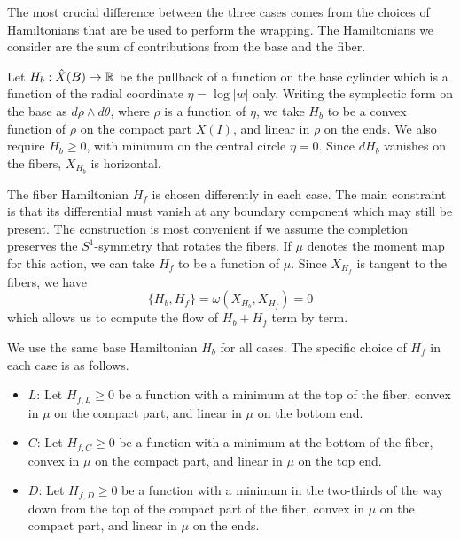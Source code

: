 \documentclass[12pt]{amsart}
\begin{document}
The most crucial difference between the three cases comes from the
choices of Hamiltonians that are be used to perform the wrapping. The
Hamiltonians we consider are the sum of contributions from the base
and the fiber. 

Let $H_b: \hat{X}(B) \to \mathbb{R}$ be the pullback of a function on the base
cylinder which is a function of the radial coordinate $\eta = \log|w|$
only. Writing the symplectic form on the base as $d\rho \wedge
d\theta$, where $\rho$ is a function of $\eta$, we take $H_b$ to be a
convex function of $\rho$ on the compact part $X(I)$, and linear in
$\rho$ on the ends. We also require $H_b \geq 0$, with minimum on the
central circle $\eta = 0$. Since $dH_b$ vanishes on the fibers, $X_{H_b}$ is
horizontal.

The fiber Hamiltonian $H_f$ is chosen differently in each case. The main
constraint is that its differential must vanish at any boundary
component which may still be present. The construction is most
convenient if we assume the completion preserves the $S^1$-symmetry
that rotates the fibers. If $\mu$ denotes the moment map for this
action, we can take $H_f$ to be a function of
$\mu$. Since $X_{H_f}$ is tangent to the fibers, we have
\begin{equation}
  \{H_b,H_f\} = \omega(X_{H_b},X_{H_f}) = 0
\end{equation}
which allows us to compute the flow of $H_b+H_f$ term by term.

We use the same base Hamiltonian $H_b$ for all cases. The specific
choice of $H_f$ in each case is as follows.
\begin{itemize}
\item $L$: Let $H_{f,L} \geq 0$ be a function with a minimum at the
  top of the fiber, convex in $\mu$ on the compact part, and linear
  in $\mu$ on the bottom end. 
\item $C$: Let $H_{f,C} \geq 0$ be a function with a minimum at the
  bottom of the fiber, convex in $\mu$ on the compact part, and linear
  in $\mu$ on the top end.
\item $D$: Let $H_{f,D} \geq 0$ be a function with a minimum in the
  two-thirds of the way down from the top of the compact part of the fiber, convex in $\mu$ on the
  compact part, and linear in $\mu$ on the ends.
\end{itemize}
\end{document}

